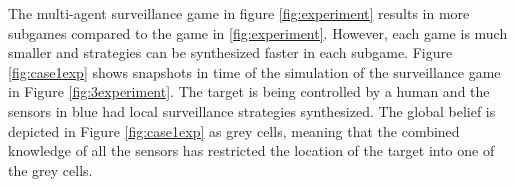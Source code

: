 The multi-agent surveillance game in figure \ref{fig:experiment} results in more subgames compared to the game in \ref{fig:experiment}. However, each game is much smaller and strategies can be synthesized faster in each subgame. Figure \ref{fig:case1exp} shows snapshots in time of the simulation of the surveillance game in Figure \ref{fig:3experiment}. The target is being controlled by a human and the sensors in blue had local surveillance strategies synthesized. The global belief is depicted in Figure \ref{fig:case1exp} as grey cells, meaning that the combined knowledge of all the sensors has restricted the location of the target into one of the grey cells.
\begin{figure}
	\begin{minipage}{5.0cm}
		\centering
\end{minipage}
\end{figure}
